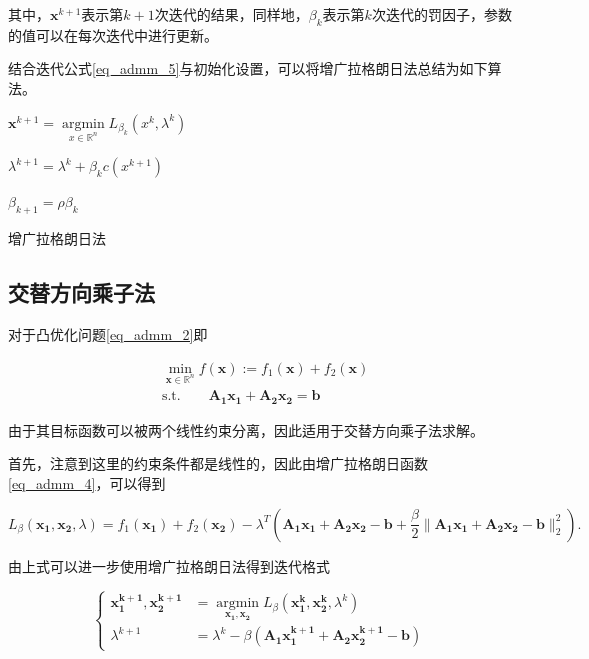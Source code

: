其中，$\bm{x}^{k+1}$表示第$k+1$次迭代的结果，同样地，$\beta_{k}$表示第$k$次迭代的罚因子，参数的值可以在每次迭代中进行更新。

结合迭代公式\ref{eq_admm_5}与初始化设置，可以将增广拉格朗日法总结为如下算法。

\begin{algorithm}\label{alg_admm_1}

    \SetAlgoLined

     {
        $\bm{x}^{k+1} = \mathop{\mathrm{argmin}}\limits_{x\in \mathbb{R}^{n}} L_{\beta_{k}}(x^{k}, \lambda^{k})$
        
        $\lambda^{k+1} = \lambda^{k} + \beta_{k} c(x^{k+1})$

        $\beta_{k+1} = \rho \beta_{k}$
    }
    \caption{增广拉格朗日法}
\end{algorithm}

\subsection{交替方向乘子法}

对于凸优化问题\ref{eq_admm_2}即

\begin{equation*}
    \begin{split}
        &\min\limits_{\bm{x}\in \mathbb{R}^{n}} f(\bm{x}) := f_{1}(\bm{x}) + f_{2}(\bm{x}) \\
        &\mathrm{s. t.} \quad\quad \bm{A_{1}x_{1}} + \bm{A_{2}x_{2}} = \bm{b} 
    \end{split}
\end{equation*}

由于其目标函数可以被两个线性约束分离，因此适用于交替方向乘子法求解。

首先，注意到这里的约束条件都是线性的，因此由增广拉格朗日函数\ref{eq_admm_4}，可以得到

\begin{equation}
    L_{\beta}(\bm{x_{1}, x_{2}}, \lambda) = f_{1}(\bm{x_{1}}) + f_{2}(\bm{x_{2}}) - \lambda^{T}(\bm{A_{1}x_{1} + A_{2}x_{2}-b} + \frac{\beta}{2}\|\bm{A_{1}x_{1} + A_{2}x_{2}-b}\|_{2}^{2}).
\end{equation}

由上式可以进一步使用增广拉格朗日法得到迭代格式

\begin{equation}
    \begin{cases}
        \bm{x_{1}^{k+1}, x_{2}^{k+1}} &= \mathop{\mathrm{argmin}}\limits_{\bm{x_{1}, x_{2}}} L_{\beta}(\bm{x_{1}^{k}, x_{2}^{k}}, \lambda^{k}) \\
        \lambda^{k+1} &= \lambda^{k} - \beta (\bm{A_{1}x_{1}^{k+1} + A_{2}x_{2}^{k+1} - b})
    \end{cases}
\end{equation}

